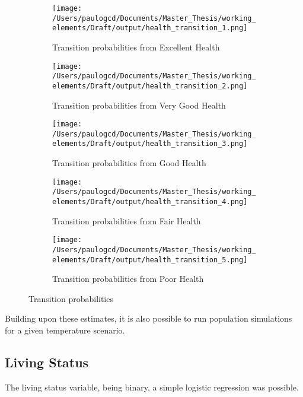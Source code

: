 \documentclass{article}
\begin{document}
\begin{figure}[H]
    \begin{subfigure}{.5\textwidth}
    \centering
    \texttt{[image: /Users/paulogcd/Documents/Master\_Thesis/working\_elements/Draft/output/health\_transition\_1.png]}
    \caption{Transition probabilities from Excellent Health}
    \label{fig:sfig1}
    \end{subfigure}%
    \begin{subfigure}{.5\textwidth}
    \centering
    \texttt{[image: /Users/paulogcd/Documents/Master\_Thesis/working\_elements/Draft/output/health\_transition\_2.png]}
    \caption{Transition probabilities from Very Good Health}
    \label{fig:sfig2}
    \end{subfigure}
    \begin{subfigure}{.5\textwidth}
    \centering
    \texttt{[image: /Users/paulogcd/Documents/Master\_Thesis/working\_elements/Draft/output/health\_transition\_3.png]}
    \caption{Transition probabilities from Good Health}
    \label{fig:sfig3}
    \end{subfigure}
    \begin{subfigure}{.5\textwidth}
    \centering
    \texttt{[image: /Users/paulogcd/Documents/Master\_Thesis/working\_elements/Draft/output/health\_transition\_4.png]}
    \caption{Transition probabilities from Fair Health}
    \label{fig:sfig4}
    \end{subfigure}
    \begin{subfigure}{.5\textwidth}
    \centering
    \texttt{[image: /Users/paulogcd/Documents/Master\_Thesis/working\_elements/Draft/output/health\_transition\_5.png]}
    \caption{Transition probabilities from Poor Health}
    \label{fig:sfig2}
    \end{subfigure}
    \caption{Transition probabilities }
\end{figure}

Building upon these estimates, it is also possible to run 
population simulations for a given temperature scenario. 

\subsection{Living Status}

The living status variable, being binary, 
a simple logistic regression was possible. 
\end{document}
